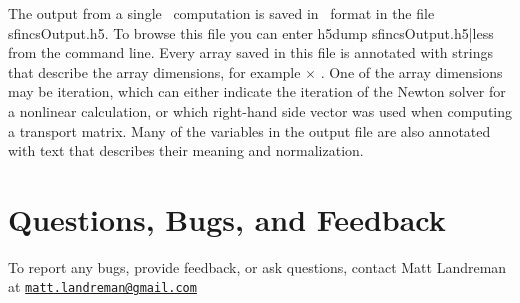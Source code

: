 The output from a single \sfincs~computation is saved in \HDF~format in the file {\ttfamily sfincsOutput.h5}.
To browse this file you can enter {\ttfamily h5dump sfincsOutput.h5|less} from the command line.
Every array saved in this file is annotated with strings that describe the array dimensions,
for example \Ntheta$\times$ \Nzeta. One of the array dimensions may be {\ttfamily iteration},
which can either indicate the iteration of the Newton solver for a nonlinear calculation,
or which right-hand side vector was used when computing a transport matrix.
Many of the variables in the output file are also annotated with
text that describes their meaning and normalization.

\section{Questions, Bugs, and Feedback}

To report any bugs, provide feedback, or ask questions, contact Matt Landreman at
\href{mailto:matt.landreman@gmail.com}{\nolinkurl{matt.landreman@gmail.com} }






